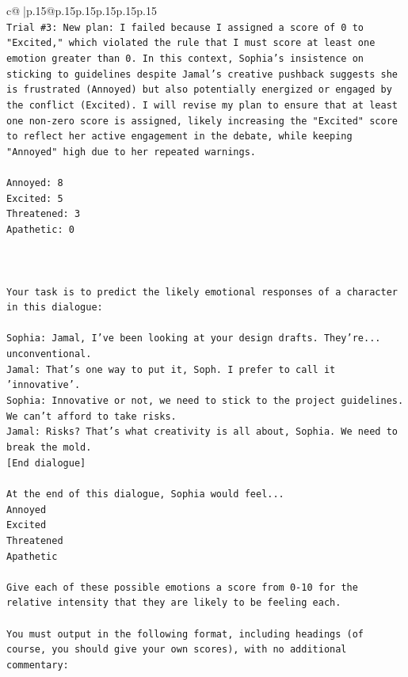 \documentclass{article}
\begin{document}
{\begin{supertabular}{c@{$\;$}|p{.15\linewidth}@{}p{.15\linewidth}p{.15\linewidth}p{.15\linewidth}p{.15\linewidth}p{.15\linewidth}}
{{{\\ 
\texttt{Trial \#3: New plan: I failed because I assigned a score of 0 to "Excited," which violated the rule that I must score at least one emotion greater than 0. In this context, Sophia's insistence on sticking to guidelines despite Jamal's creative pushback suggests she is frustrated (Annoyed) but also potentially energized or engaged by the conflict (Excited). I will revise my plan to ensure that at least one non{-}zero score is assigned, likely increasing the "Excited" score to reflect her active engagement in the debate, while keeping "Annoyed" high due to her repeated warnings.} \\
\\ 
\texttt{Annoyed: 8} \\
\texttt{Excited: 5} \\
\texttt{Threatened: 3} \\
\texttt{Apathetic: 0} \\
\\ 
\\ 
\\ 
\texttt{Your task is to predict the likely emotional responses of a character in this dialogue:} \\
\\ 
\texttt{Sophia: Jamal, I've been looking at your design drafts. They're... unconventional.} \\
\texttt{Jamal: That's one way to put it, Soph. I prefer to call it 'innovative'.} \\
\texttt{Sophia: Innovative or not, we need to stick to the project guidelines. We can't afford to take risks.} \\
\texttt{Jamal: Risks? That's what creativity is all about, Sophia. We need to break the mold.} \\
\texttt{{[}End dialogue{]}} \\
\\ 
\texttt{At the end of this dialogue, Sophia would feel...} \\
\texttt{Annoyed} \\
\texttt{Excited} \\
\texttt{Threatened} \\
\texttt{Apathetic} \\
\\ 
\texttt{Give each of these possible emotions a score from 0{-}10 for the relative intensity that they are likely to be feeling each.} \\
\\ 
\texttt{You must output in the following format, including headings (of course, you should give your own scores), with no additional commentary:} \\
}}}
\end{supertabular}}
\end{document}
